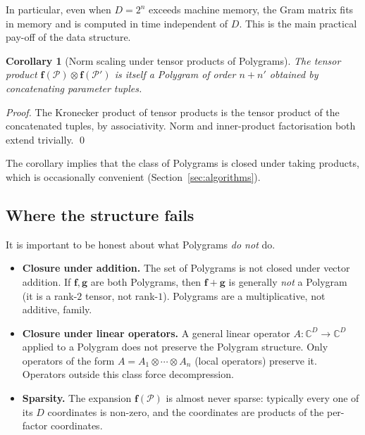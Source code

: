 \documentclass[11pt,letterpaper]{article}
\newtheorem{corollary}[theorem]{Corollary}
\theoremstyle{definition}
\newcommand{\C}{\mathbb{C}}
\newcommand{\Polygram}{\mathcal{P}}
\begin{document}
In particular, even when $D = 2^{n}$ exceeds machine memory, the Gram matrix
fits in memory and is computed in time independent of $D$. This is the main
practical pay-off of the data structure.

\begin{corollary}[Norm scaling under tensor products of Polygrams]
\label{cor:tensor-of-polygrams}
The tensor product $\bm{f}(\Polygram) \otimes \bm{f}(\Polygram')$ is itself a
Polygram of order $n + n'$ obtained by concatenating parameter tuples.
\end{corollary}
\begin{proof}
The Kronecker product of tensor products is the tensor product of the
concatenated tuples, by associativity. Norm and inner-product factorisation
both extend trivially. \qed
\end{proof}

The corollary implies that the class of Polygrams is closed under taking
products, which is occasionally convenient (Section~\ref{sec:algorithms}).

\subsection{Where the structure fails}

It is important to be honest about what Polygrams \emph{do not} do.

\begin{itemize}[leftmargin=*, itemsep=4pt]
\item \textbf{Closure under addition.} The set of Polygrams is not closed under
      vector addition. If $\bm{f}, \bm{g}$ are both Polygrams, then $\bm{f} +
      \bm{g}$ is generally \emph{not} a Polygram (it is a rank-$2$ tensor, not
      rank-$1$). Polygrams are a multiplicative, not additive, family.
\item \textbf{Closure under linear operators.} A general linear operator
      $A : \C^{D} \to \C^{D}$ applied to a Polygram does not preserve the
      Polygram structure. Only operators of the form $A = A_{1} \otimes \cdots
      \otimes A_{n}$ (local operators) preserve it. Operators outside this
      class force decompression.
\item \textbf{Sparsity.} The expansion $\bm{f}(\Polygram)$ is almost never
      sparse: typically every one of its $D$ coordinates is non-zero, and the
      coordinates are products of the per-factor coordinates.
\end{itemize}
\end{document}
